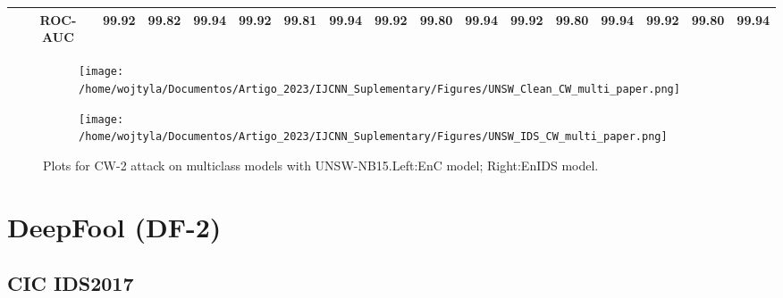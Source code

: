 \documentclass[conference]{IEEEtran}
\begin{document}
\begin{table}[H]
\begin{tabular}{|c|c|c|c|c|c|c|c|c|c|c|c|c|c|c|c|c|}
			& ROC-AUC & \cellcolor{yellow!50}99.92 & \cellcolor{yellow!50}99.82 & \cellcolor{yellow!50}99.94 & \cellcolor{yellow!50}99.92 & \cellcolor{yellow!50}99.81 & \cellcolor{yellow!50}99.94 & \cellcolor{yellow!50}99.92 & \cellcolor{yellow!50}99.80 & \cellcolor{yellow!50}99.94 & \cellcolor{yellow!50}99.92 & \cellcolor{yellow!50}99.80 & \cellcolor{yellow!50}99.94 & \cellcolor{yellow!50}99.92 & \cellcolor{yellow!50}99.80 & \cellcolor{yellow!50}99.94
			\\
			\hline
		\end{tabular}		
	\end{table}
	
	
	\begin{figure}[H]
		\centering
		\begin{subfigure}[b]{0.45\textwidth}
			\texttt{[image: /home/wojtyla/Documentos/Artigo\_2023/IJCNN\_Suplementary/Figures/UNSW\_Clean\_CW\_multi\_paper.png]}
			\label{fig:1}
		\end{subfigure}
		\hfill
		\begin{subfigure}[b]{0.45\textwidth}
			\texttt{[image: /home/wojtyla/Documentos/Artigo\_2023/IJCNN\_Suplementary/Figures/UNSW\_IDS\_CW\_multi\_paper.png]}
			\label{fig:4}
		\end{subfigure}
		\caption{Plots for CW-2 attack on multiclass models with UNSW-NB15.Left:EnC model; Right:EnIDS model.}
		\label{fig:unsw_cw_multi}
	\end{figure}
	
	
	\section{DeepFool (DF-2)}
	
	\subsection{CIC IDS2017}
	
\end{document}
